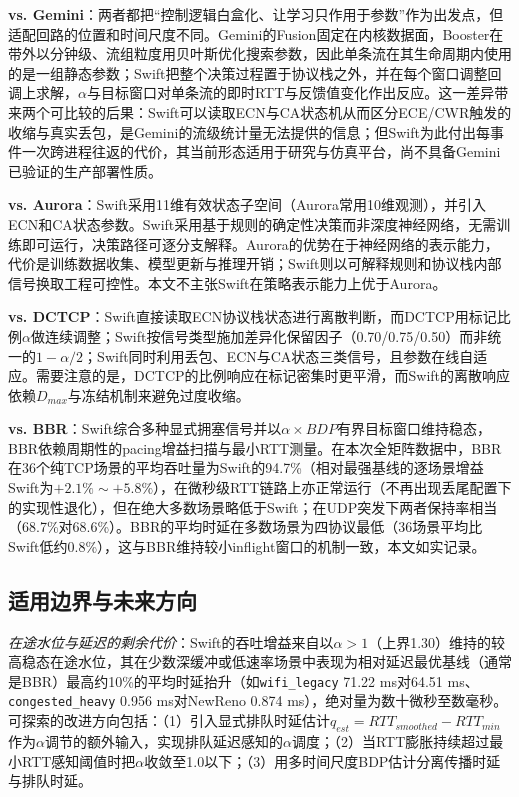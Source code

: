 \documentclass[10pt,twocolumn]{article}
\begin{document}
\textbf{vs. Gemini\cite{gemini}}：两者都把“控制逻辑白盒化、让学习只作用于参数”作为出发点，但适配回路的位置和时间尺度不同。Gemini的Fusion固定在内核数据面，Booster在带外以分钟级、流组粒度用贝叶斯优化搜索参数，因此单条流在其生命周期内使用的是一组静态参数；Swift把整个决策过程置于协议栈之外，并在每个窗口调整回调上求解，$\alpha$与目标窗口对单条流的即时RTT与反馈值变化作出反应。这一差异带来两个可比较的后果：Swift可以读取ECN与CA状态机从而区分ECE/CWR触发的收缩与真实丢包，是Gemini的流级统计量无法提供的信息；但Swift为此付出每事件一次跨进程往返的代价，其当前形态适用于研究与仿真平台，尚不具备Gemini已验证的生产部署性质。

\textbf{vs. Aurora\cite{aurora}}：Swift采用11维有效状态子空间（Aurora常用10维观测），并引入ECN和CA状态参数。Swift采用基于规则的确定性决策而非深度神经网络，无需训练即可运行，决策路径可逐分支解释。Aurora的优势在于神经网络的表示能力，代价是训练数据收集、模型更新与推理开销；Swift则以可解释规则和协议栈内部信号换取工程可控性。本文不主张Swift在策略表示能力上优于Aurora。

\textbf{vs. DCTCP\cite{dctcp}}：Swift直接读取ECN协议栈状态进行离散判断，而DCTCP用标记比例$\alpha$做连续调整；Swift按信号类型施加差异化保留因子（0.70/0.75/0.50）而非统一的$1-\alpha/2$；Swift同时利用丢包、ECN与CA状态三类信号，且参数在线自适应。需要注意的是，DCTCP的比例响应在标记密集时更平滑，而Swift的离散响应依赖$D_{max}$与冻结机制来避免过度收缩。

\textbf{vs. BBR\cite{bbr}}：Swift综合多种显式拥塞信号并以$\alpha \times BDP$有界目标窗口维持稳态，BBR依赖周期性的pacing增益扫描与最小RTT测量。在本次全矩阵数据中，BBR在36个纯TCP场景的平均吞吐量为Swift的94.7\%（相对最强基线的逐场景增益Swift为$+2.1\%\sim+5.8\%$），在微秒级RTT链路上亦正常运行（不再出现丢尾配置下的实现性退化），但在绝大多数场景略低于Swift；在UDP突发下两者保持率相当（68.7\%对68.6\%）。BBR的平均时延在多数场景为四协议最低（36场景平均比Swift低约0.8\%），这与BBR维持较小inflight窗口的机制一致，本文如实记录。

\subsection{适用边界与未来方向}
\label{subsec:limitations}

\textit{在途水位与延迟的剩余代价}：Swift的吞吐增益来自以$\alpha>1$（上界1.30）维持的较高稳态在途水位，其在少数深缓冲或低速率场景中表现为相对延迟最优基线（通常是BBR）最高约10\%的平均时延抬升（如\texttt{wifi\_legacy} 71.22 ms对64.51 ms、\texttt{congested\_heavy} 0.956 ms对NewReno 0.874 ms），绝对量为数十微秒至数毫秒。可探索的改进方向包括：（1）引入显式排队时延估计$q_{est} = RTT_{smoothed} - RTT_{min}$作为$\alpha$调节的额外输入，实现排队延迟感知的$\alpha$调度；（2）当RTT膨胀持续超过最小RTT感知阈值时把$\alpha$收敛至1.0以下；（3）用多时间尺度BDP估计分离传播时延与排队时延。
\end{document}
